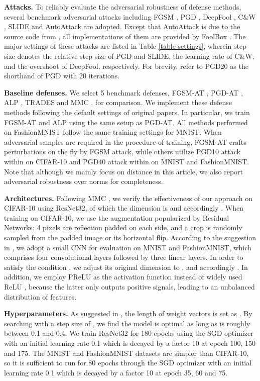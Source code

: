 \documentclass[preprint,review,12pt]{elsarticle}
\numberwithin{equation}{section}
\begin{document}
\textbf{Attacks.}
To reliably evaluate the adversarial robustness of defense methods,
several benchmark adversarial attacks including
FGSM \cite{goodfellow2015}, PGD \cite{madry2018}, DeepFool \cite{moosavi2016}, C\&W \cite{carlini2017},
SLIDE \cite{tramer2019} and AutoAttack \cite{croce2020} are adopted.
Except that AutoAttack is due to the source code from \cite{croce2020},
all implementations of them are provided by FoolBox \cite{foolbox2017}.
The major settings of these attacks are listed in Table \ref{table-settings},
wherein step size denotes the relative step size of PGD and SLIDE,
the learning rate of C\&W, and the overshoot of DeepFool, respectively.
For brevity, refer to PGD20 as the shorthand of PGD with 20 iterations.

\textbf{Baseline defenses.} We select 5 benchmark defenses,
FGSM-AT \cite{goodfellow2015}, PGD-AT \cite{madry2018}, ALP \cite{kannan2018}, TRADES \cite{zhang2019b} and MMC \cite{pang2020},
for comparison.
We implement these defense methods following the default settings of original papers.
In particular, we train FGSM-AT and ALP using the same setup as PGD-AT.
All methods performed on FashionMNIST follow the same training settings for MNIST.
When adversarial samples are required in the procedure of training,
FGSM-AT crafts perturbations on the fly by FGSM attack,
while others utilize PGD10 attack within  on CIFAR-10
and PGD40 attack within  on MNIST and FashionMNIST.
Note that although we mainly focus on  distance in this article,
we also report adversarial robustness over  norms for completeness.

\textbf{Architectures.}
Following MMC \cite{pang2020},
we verify the effectiveness of our approach on CIFAR-10 using ResNet32,
of which the dimension is  and accordingly .
When training on CIFAR-10, we use the augmentation popularized by Residual Networks:
4 pixels are reflection padded on each side, and a  crop is randomly sampled from the padded image or its horizontal flip.
According to the suggestion in \cite{carlini2017,zhang2019b},
we adopt a small CNN for evaluation on MNIST and FashionMNIST,
which comprises four convolutional layers followed by three linear layers.
In order to satisfy the condition , we adjust its original dimension  to ,
and accordingly .
In addition, we employ PReLU\cite{he2015} as the activation function instead of widely used ReLU \cite{nair2010},
because the latter only outputs positive signals, leading to an unbalanced distribution of features.


\textbf{Hyperparameters.}
As suggested in \cite{pang2018}, the length of weight vectors is set as .
By searching  with a step size of ,
we find the model is optimal as long as  is roughly between 0.1 and 0.4.
We train ResNet32 for 180 epochs
using the SGD optimizer with an initial learning rate 0.1 which is decayed by a factor 10 at epoch 100, 150 and 175.
The MNIST and FashionMNIST datasets are simpler than CIFAR-10,
so it is sufficient to run for 80 epochs through the SGD optimizer
with an initial learning rate 0.1 which is decayed by a factor 10 at epoch 35, 60 and 75.
\end{document}
